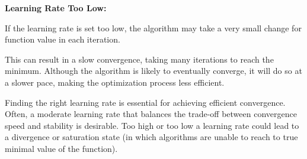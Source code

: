 \documentclass[12pt]{article}
\begin{document}
\textbf{Learning Rate Too Low:}

If the learning rate is set too low, the algorithm may take a very small change for function value in each iteration.

This can result in a slow convergence, taking many iterations to reach the minimum. Although the algorithm is likely to eventually converge, it will do so at a slower pace, making the optimization process less efficient.

Finding the right learning rate is essential for achieving efficient convergence. Often, a moderate learning rate that balances the trade-off between convergence speed and stability is desirable. Too high or too low a learning rate could lead to a divergence or saturation state (in which algorithms are unable to reach to true minimal value of the function).
\end{document}
